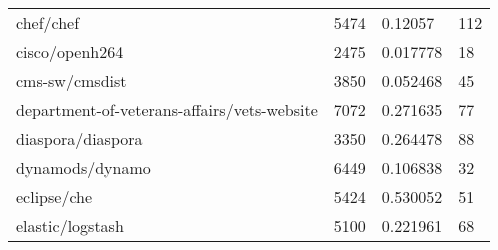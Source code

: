 \begin{table}[]
\begin{tabular}{llll}
chef/chef                                   & 5474                               & 0.12057                                                                                                           & 112                                                                                                           \\
cisco/openh264                              & 2475                               & 0.017778                                                                                                          & 18                                                                                                            \\
cms-sw/cmsdist                              & 3850                               & 0.052468                                                                                                          & 45                                                                                                            \\
department-of-veterans-affairs/vets-website & 7072                               & 0.271635                                                                                                          & 77                                                                                                            \\
diaspora/diaspora                           & 3350                               & 0.264478                                                                                                          & 88                                                                                                            \\
dynamods/dynamo                             & 6449                               & 0.106838                                                                                                          & 32                                                                                                            \\
eclipse/che                                 & 5424                               & 0.530052                                                                                                          & 51                                                                                                            \\
elastic/logstash                            & 5100                               & 0.221961                                                                                                          & 68                                                                                                            \\

\end{tabular}
\end{table}

